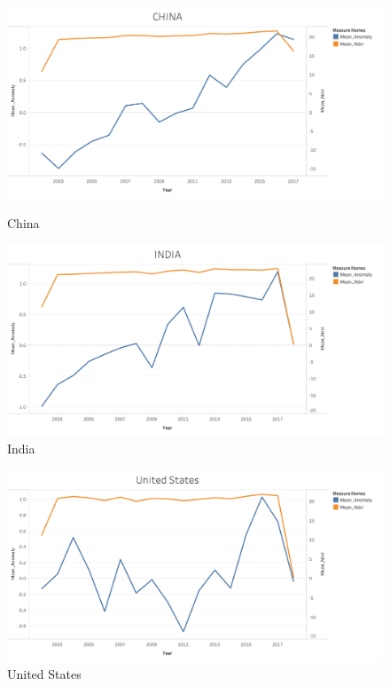 \begin{itemize}
     \begin{figure}[!htb]
        \begin{minipage}{0.5\textwidth}
            \centering
            \includegraphics[width=1.0\linewidth]{figures/ch5/Mean/CHINA_mean.png}
            \caption{China}\label{Fig:CHINA_mean}
        \end{minipage}\hfill
        \begin{minipage}{0.5\textwidth}
            \centering
            \includegraphics[width=1.0\linewidth]{figures/ch5/Mean/INDIA_mean.png}
            \caption{India}\label{Fig:INDIA_mean}
        \end{minipage}
    \end{figure}
    
     \begin{figure}[H]
            \centering
            \includegraphics[width=0.5\linewidth]{figures/ch5/Mean/US_mean.png}
            \caption{\label{fig:US_mean} United States}
    \end{figure}


\end{itemize}

